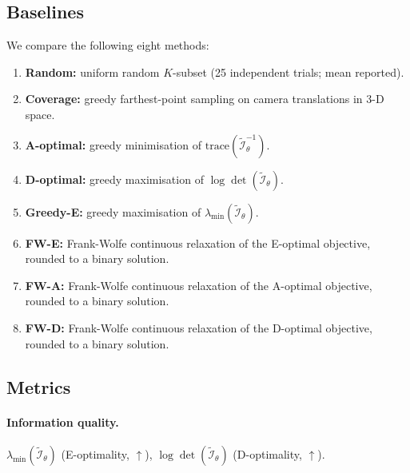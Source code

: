 \documentclass[letterpaper, 9
 pt, conference]{ieeeconf}
\begin{document}
\subsection{Baselines}

We compare the following eight methods:
\begin{enumerate}[leftmargin=1.5em]
    \item \textbf{Random:} uniform random $K$-subset (25 independent trials;
    mean reported).
    \item \textbf{Coverage:} greedy farthest-point sampling on camera
    translations in 3-D space.
    \item \textbf{A-optimal:} greedy minimisation of
    $\mathrm{trace}(\widetilde{\mathcal I}_{\theta}^{-1})$.
    \item \textbf{D-optimal:} greedy maximisation of
    $\log\det(\widetilde{\mathcal I}_{\theta})$.
    \item \textbf{Greedy-E:} greedy maximisation of
    $\lambda_{\min}(\widetilde{\mathcal I}_{\theta})$.
    \item \textbf{FW-E:} Frank-Wolfe continuous relaxation of the
    E-optimal objective, rounded to a binary solution.
    \item \textbf{FW-A:} Frank-Wolfe continuous relaxation of the
    A-optimal objective, rounded to a binary solution.
    \item \textbf{FW-D:} Frank-Wolfe continuous relaxation of the
    D-optimal objective, rounded to a binary solution.
\end{enumerate}

\subsection{Metrics}

\paragraph{Information quality.}
$\lambda_{\min}(\widetilde{\mathcal I}_{\theta})$ (E-optimality, $\uparrow$),
$\log\det(\widetilde{\mathcal I}_{\theta})$ (D-optimality, $\uparrow$).
\end{document}
